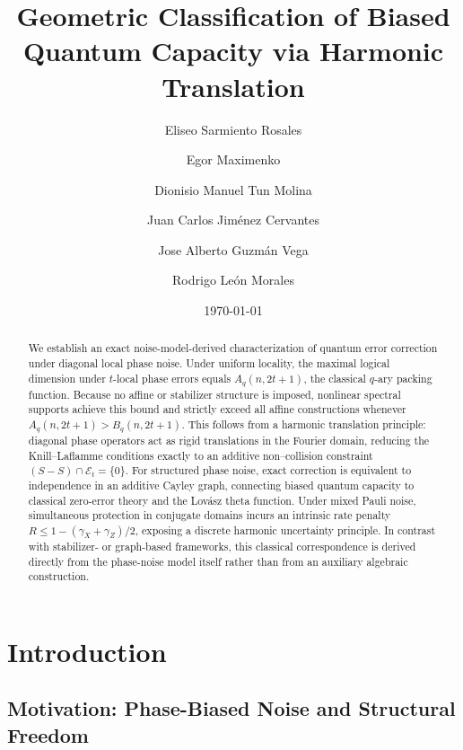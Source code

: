 \documentclass[a4paper,twocolumn,11pt,allowtoday]{quantumarticle}
\title{Geometric Classification of Biased Quantum Capacity via Harmonic Translation}
\author{Eliseo Sarmiento Rosales}
\affiliation{Instituto Politécnico Nacional (IPN), Mexico}
\author{Egor Maximenko}
\affiliation{Instituto Politécnico Nacional (IPN), Mexico}
\author{Dionisio Manuel Tun Molina}
\affiliation{Instituto Politécnico Nacional (IPN), Mexico}
\author{Juan Carlos Jiménez Cervantes}
\affiliation{Instituto Politécnico Nacional (IPN), Mexico}
\author{Jose Alberto Guzmán Vega}
\affiliation{Instituto Politécnico Nacional (IPN), Mexico}
\author{Rodrigo León Morales}
\affiliation{Instituto Politécnico Nacional (IPN), Mexico}
\date{\today}
\theoremstyle{plain}
\theoremstyle{definition}
\theoremstyle{remark}
\begin{document}
\maketitle


\begin{abstract}

We establish an exact noise-model-derived characterization of quantum error correction under diagonal local phase noise.
Under uniform locality, the maximal logical dimension under $t$-local phase errors equals $A_q(n,2t+1)$, the classical $q$-ary packing function. Because no affine or stabilizer structure is imposed, nonlinear spectral supports achieve this bound and strictly exceed all affine constructions whenever $A_q(n,2t+1) > B_q(n,2t+1)$.
This follows from a harmonic translation principle: diagonal phase operators act as rigid translations in the Fourier domain, reducing the Knill--Laflamme conditions exactly to an additive non--collision constraint $(S - S) \cap \mathcal{E}_t = \{0\}$.
For structured phase noise, exact correction is equivalent to independence in an additive Cayley graph, connecting biased quantum capacity to classical zero-error theory and the Lov\'asz theta function.
Under mixed Pauli noise, simultaneous protection in conjugate domains incurs an intrinsic rate penalty $R \leq 1 - (\gamma_X + \gamma_Z)/2$, exposing a discrete harmonic uncertainty principle.
In contrast with stabilizer- or graph-based frameworks, this classical correspondence is derived directly from the phase-noise model itself rather than from an auxiliary algebraic construction.
\end{abstract}



\section{Introduction}
\label{sec:introduction}


\subsection{Motivation: Phase-Biased Noise and Structural Freedom}
\label{subsec:motivation}
\end{document}

